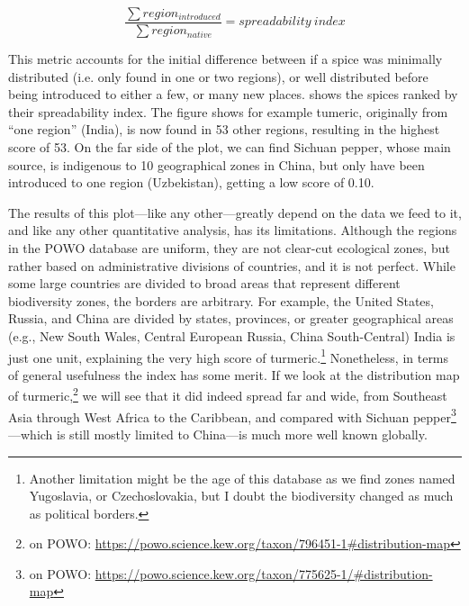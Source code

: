\[ \frac{\sum region_{introduced}}{\sum region_{native}} = spreadability~index \]

\noindent This metric accounts for the initial difference between if a spice was minimally distributed (i.e. only found in one or two regions), or well distributed before being introduced to either a few, or many new places.  shows the spices ranked by their spreadability index. The figure shows for example tumeric, originally from ``one region'' (India), is now found in 53 other regions, resulting in the highest score of 53. On the far side of the plot, we can find Sichuan pepper, whose main source,  is indigenous to 10 geographical zones in China, but only have been introduced to one region (Uzbekistan), getting a low score of 0.10.

The results of this plot---like any other---greatly depend on the data we feed to it, and like any other quantitative analysis, has its limitations. Although the regions in the \gls{POWO} database are uniform, they are not clear-cut ecological zones, but rather based on administrative divisions of countries, and it is not perfect. While some large countries are divided to broad areas that represent different biodiversity zones, the borders are arbitrary. For example, the United States, Russia, and China are divided by states, provinces, or greater geographical areas (e.g., New South Wales, Central European Russia, China South-Central) India is just one unit, explaining the very high score of turmeric.\footnote{Another limitation might be the age of this database as we find zones named Yugoslavia, or Czechoslovakia, but I doubt the biodiversity changed as much as political borders.} Nonetheless, in terms of general usefulness the index has some merit. If we look at the distribution map of turmeric,\footnote{ on \gls{POWO}: \url{https://powo.science.kew.org/taxon/796451-1\#distribution-map}} we will see that it did indeed spread far and wide, from Southeast Asia through West Africa to the Caribbean, and compared with Sichuan pepper\footnote{ on \gls{POWO}: \url{https://powo.science.kew.org/taxon/775625-1/\#distribution-map}}---which is still mostly limited to China---is much more well known globally.




